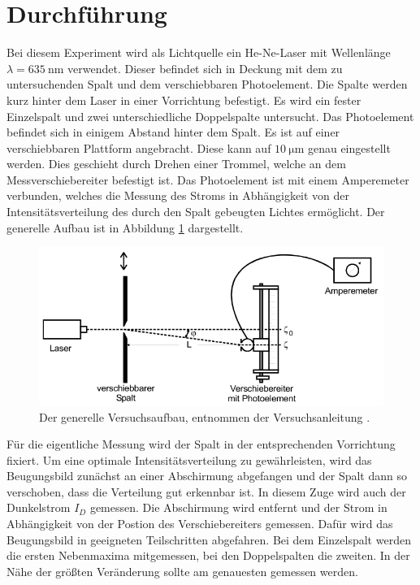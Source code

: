 \section{Durchführung}
\label{sec:Durchführung}

Bei diesem Experiment wird als Lichtquelle ein He-Ne-Laser mit Wellenlänge $\lambda = \SI{635}{\nano\metre}$ verwendet.
Dieser befindet sich in Deckung mit dem zu untersuchenden Spalt und dem verschiebbaren Photoelement.
Die Spalte werden kurz hinter dem Laser in einer Vorrichtung befestigt.
Es wird ein fester Einzelspalt und zwei unterschiedliche Doppelspalte untersucht.
Das Photoelement befindet sich in einigem Abstand hinter dem Spalt.
Es ist auf einer verschiebbaren Plattform angebracht.
Diese kann auf $\SI{10}{\micro\metre}$ genau eingestellt werden.
Dies geschieht durch Drehen einer Trommel, welche an dem Messverschiebereiter befestigt ist.
Das Photoelement ist mit einem Amperemeter verbunden, welches die Messung des Stroms in Abhängigkeit von der Intensitätsverteilung des durch den Spalt gebeugten Lichtes ermöglicht.
Der generelle Aufbau ist in Abbildung \ref{fig:Aufbau} dargestellt.

\begin{figure}
  \centering
  \includegraphics[scale=0.7]{images/Aufbau.png}
  \caption{Der generelle Versuchsaufbau, entnommen der Versuchsanleitung \cite[36]{1}.}
  \label{fig:Aufbau}
\end{figure}

Für die eigentliche Messung wird der Spalt in der entsprechenden Vorrichtung fixiert.
Um eine optimale Intensitätsverteilung zu gewährleisten, wird das Beugungsbild zunächst an einer Abschirmung abgefangen und der Spalt dann so verschoben, dass die Verteilung gut erkennbar ist.
In diesem Zuge wird auch der Dunkelstrom $I_D$ gemessen.
Die Abschirmung wird entfernt und der Strom in Abhängigkeit von der Postion des Verschiebereiters gemessen.
Dafür wird das Beugungsbild in geeigneten Teilschritten abgefahren.
Bei dem Einzelspalt werden die ersten Nebenmaxima mitgemessen, bei den Doppelspalten die zweiten.
In der Nähe der größten Veränderung sollte am genauesten gemessen werden.
